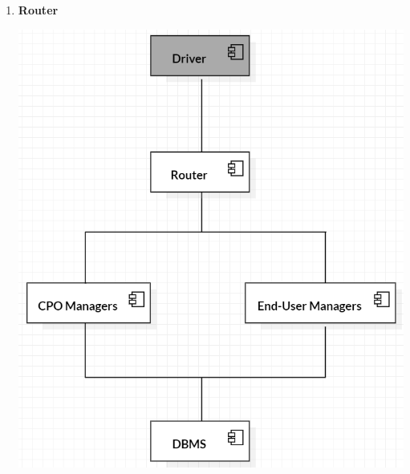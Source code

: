 \documentclass[a4paper]{report}
\begin{document}
\begin{enumerate}
    \item \textbf{Router}\par
    \begin{minipage}{\linewidth}
        \centering
        \includegraphics[scale=0.5]{img/INTEGRATION_3.png}
    \end{minipage}
    

\end{enumerate}
\end{document}
